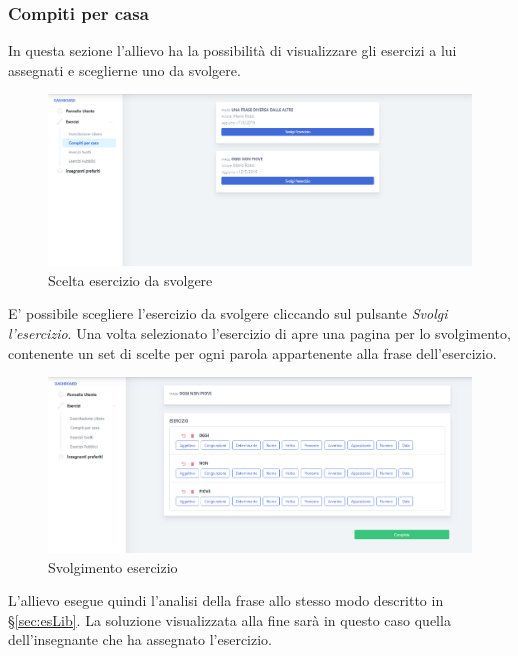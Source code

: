       
        \newpage
  		\subsubsection{Compiti per casa}
 		  In questa sezione l'allievo ha la possibilità di visualizzare gli esercizi a lui assegnati e sceglierne uno da svolgere.
        	\begin{figure}[H]
            	\centering
            	\includegraphics[width=17cm]{sez/img/studente/compitopercasa.PNG} 
            	\caption{Scelta esercizio da svolgere}\label{fig:1}
        	\end{figure}

		  E' possibile scegliere l'esercizio da svolgere cliccando sul pulsante \textit{Svolgi l'esercizio}. Una volta selezionato l'esercizio di apre una pagina per lo svolgimento, contenente un set di scelte per ogni parola appartenente alla frase dell'esercizio.     
       
        	\begin{figure}[H]
            	\centering
            	\includegraphics[width=17cm]{sez/img/studente/svolgimentoesercizio.PNG} 
            	\caption{Svolgimento esercizio}\label{fig:1}
        	\end{figure}      
	L'allievo esegue quindi l'analisi della frase allo stesso modo descritto in \S\ref{sec:esLib}. La soluzione visualizzata alla fine sarà in questo caso quella dell'insegnante che ha assegnato l'esercizio. \newpage
	
